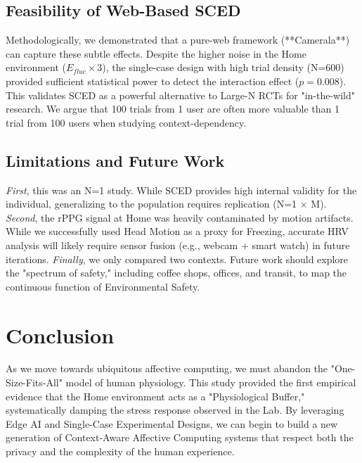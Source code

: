 \documentclass[journal]{IEEEtran}
\begin{document}
\subsection{Feasibility of Web-Based SCED}
Methodologically, we demonstrated that a pure-web framework (**Camerala**) can capture these subtle effects.
Despite the higher noise in the Home environment ($E_{fluc} \times 3$), the single-case design with high trial density (N=600) 
provided sufficient statistical power to detect the interaction effect ($p=0.008$).
This validates SCED as a powerful alternative to Large-N RCTs for "in-the-wild" research. 
We argue that 100 trials from 1 user are often more valuable than 1 trial from 100 users when studying context-dependency.

\subsection{Limitations and Future Work}
\textit{First}, this was an N=1 study. While SCED provides high internal validity for the individual, generalizing to the population requires replication (N=1 $\times$ M).
\textit{Second}, the rPPG signal at Home was heavily contaminated by motion artifacts. 
While we successfully used Head Motion as a proxy for Freezing, accurate HRV analysis will likely require sensor fusion (e.g., webcam + smart watch) in future iterations.
\textit{Finally}, we only compared two contexts. Future work should explore the "spectrum of safety," including coffee shops, offices, and transit, 
to map the continuous function of Environmental Safety.

\section{Conclusion}
As we move towards ubiquitous affective computing, we must abandon the "One-Size-Fits-All" model of human physiology. 
This study provided the first empirical evidence that the Home environment acts as a "Physiological Buffer," systematically damping the stress response 
observed in the Lab. By leveraging Edge AI and Single-Case Experimental Designs, we can begin to build a new generation of 
Context-Aware Affective Computing systems that respect both the privacy and the complexity of the human experience.

\appendices
\end{document}
